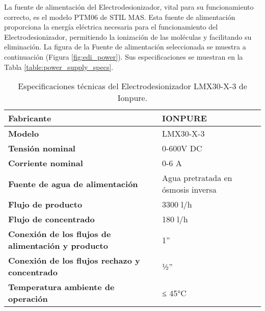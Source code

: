 
La fuente de alimentación del Electrodesionizador, vital para su funcionamiento correcto, es el modelo PTM06 de STIL MAS. Esta fuente de alimentación proporciona la energía eléctrica necesaria para el funcionamiento del Electrodesionizador, permitiendo la ionización de las moléculas y facilitando su eliminación. La figura de la Fuente de alimentación seleccionada se muestra a continuación (Figura \ref{fig:edi_power}). Sus especificaciones se muestran en la Tabla \ref{table:power_supply_specs}.


\begin{table}[H]
    \centering
    \caption{Especificaciones técnicas del Electrodesionizador LMX30-X-3 de Ionpure.}
    \label{table:edi_specs}
    \begin{tabular}{| L{6cm} | L{6cm} |}
        \hline
        \textbf{Fabricante}                                        & IONPURE                            \\
        \hline
        \textbf{Modelo}                                            & LMX30-X-3                          \\
        \hline
        \textbf{Tensión nominal}                                   & 0-600V DC                          \\
        \hline
        \textbf{Corriente nominal}                                 & 0-6 A                              \\
        \hline
        \textbf{Fuente de agua de alimentación}                    & Agua pretratada en ósmosis inversa \\
        \hline
        \textbf{Flujo de producto}                                 & 3300 l/h                           \\
        \hline
        \textbf{Flujo de concentrado}                              & 180 l/h                            \\
        \hline
        \textbf{Conexión de los flujos de alimentación y producto} & 1”                                 \\
        \hline
        \textbf{Conexión de los flujos rechazo y concentrado}      & ½”                                 \\
        \hline
        \textbf{Temperatura ambiente de operación}                 & ≤ 45°C                             \\
        \hline
    \end{tabular}
\end{table}

